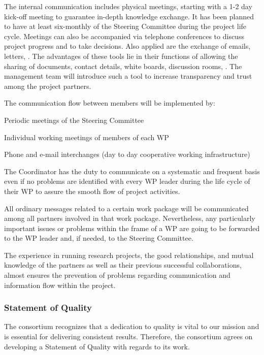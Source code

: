 The internal communication includes physical meetings, starting with a
1-2 day kick-off meeting to guarantee in-depth knowledge exchange.  It
has been planned to have at least six-monthly of the Steering Committee during the project life cycle.  Meetings can also be
accompanied via telephone conferences to discuss project progress and
to take decisions. Also applied are the exchange of emails, letters,
\etc. The advantages of these tools lie in their
functions of allowing the sharing of documents, contact details, white
boards, discussion rooms, \etc. The management team will introduce
such a tool to increase transparency and trust among the project
partners.

The communication flow between \Project{} members will be implemented by:
\begin{denseItemize}
\item Periodic meetings of the Steering Committee
\item Individual working meetings of members of each WP
\item Phone and e-mail interchanges (day to day cooperative working infrastructure)
\end{denseItemize}

The Coordinator has the duty to communicate on a
systematic and frequent basis even if no problems are identified with
every WP leader during the life cycle of their WP to assure the smooth
flow of \Project{} project activities.

All ordinary messages related to a certain work package will be
communicated among all partners involved in that
work package. Nevertheless, any particularly important issues or problems
within the frame of a WP are going to be forwarded to the WP leader
and, if needed, to the Steering Committee.

The experience in running research projects, the good relationships,
and mutual knowledge of the partners as well as their previous
successful collaborations, almost ensures the prevention of problems
regarding communication and information flow within the \Project{} project.


\subsubsection{Statement of Quality}

The \Project{} consortium recognizes that a dedication to quality is
vital to our mission and is essential for delivering
consistent results. Therefore, the consortium agrees on developing a
Statement of Quality with regards to its work.


